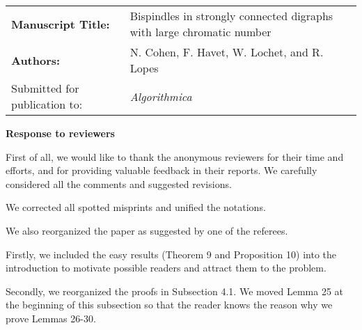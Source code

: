 \documentclass[]{article}
\begin{document}
\noindent\begin{tabular}{ll}
\textbf{Manuscript Title:} & Bispindles in strongly connected digraphs with large chromatic number \\[1mm]
\textbf{Authors:} & N. Cohen, F. Havet, W. Lochet, and R. Lopes\\[1mm]
Submitted for publication to:& \emph{Algorithmica}
\end{tabular}

\bigskip
\begin{center}
  {\Large{\textbf{Response to reviewers}}}
\end{center}
\bigskip


First of all, we would like to thank the anonymous reviewers for their time and
efforts, and for providing valuable feedback in their reports. We carefully
considered all the comments and suggested revisions. 


\medskip

We corrected all spotted misprints and unified the notations.

\medskip

We also reorganized the paper as suggested by one of the referees.

Firstly, we included the easy results (Theorem 9 and Proposition 10) into the introduction to motivate possible readers and attract them to the problem.

Secondly, we reorganized the proofs in Subsection 4.1. We moved Lemma 25 at the beginning of this subsection so that the reader knows the reason why we prove Lemmas 26-30.


\medskip 


%
%
\end{document}
